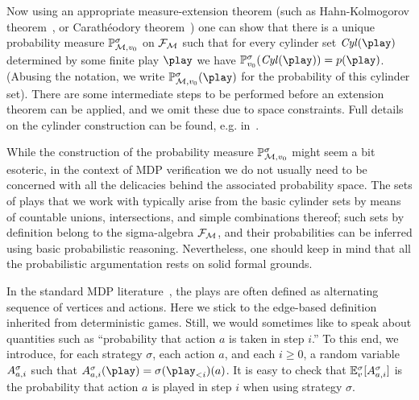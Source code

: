 Now using an appropriate measure-extension theorem
(such as Hahn-Kol\-mo\-go\-rov theorem~\cite[Corollary 2.5.4 and Proposition  2.5.7]{Rosenthal:2006}, or Carath\'eodory theorem~\cite[Theorem 1.3.10]{Ash&Doleans-Dade:2000}) one can show that there is a 
unique probability 
measure $\mathbb{P}^{\sigma}_{\mathcal{M},v_0} $ on $\mathcal{F}_{\mathcal{M}}$ such that for 
every cylinder set $\cylinder(\play)$ determined by some finite play $\play$ we have $\probm_{\vinit}^\sigma(\cylinder(\play))=\cylProb(\play)$. (Abusing the notation, we write $\probm^{\sigma}_{\mdp,\vinit}(\play)$ for the probability of this cylinder set). There 
are some intermediate steps to be performed before an extension theorem 
can be applied, and we omit these due to space constraints. Full details on the 
cylinder construction can be found, e.g. in~\cite{Ash&Doleans-Dade:2000,Novotny:2015}.

While the construction of the probability measure 
$\mathbb{P}^{\sigma}_{\mathcal{M},v_0}$ might seem a bit esoteric, in the context of 
MDP verification we do not usually need to be concerned with all the delicacies 
behind the associated probability space. The sets of plays that we work with 
typically arise from the basic cylinder sets by means of countable unions, 
intersections, and simple combinations thereof; such sets by definition belong 
to the 
sigma-algebra $\mathcal{F}_{\mathcal{M}}$, and their probabilities can be inferred using 
basic probabilistic reasoning. Nevertheless, one should keep in mind that all the 
probabilistic argumentation rests on solid formal grounds. 


In the standard MDP literature~\cite{Puterman:2005}, the plays are often defined as alternating sequence of vertices and actions. Here we stick to the edge-based definition inherited from deterministic games. Still, we would sometimes like to speak about quantities such as ``probability that action $a$ is taken in step $i$.'' To this end, we introduce, for each strategy $\sigma$, each action $a$,  and each $i\geq 0$,  a random variable $A^{\sigma}_{a,i}$ such that $\actevent{\sigma}{a}{i}(\play)=\sigma(\play_{< i})(a)$. It is easy to check that  $\mathbb{E}^\sigma_v[A^{\sigma}_{a,i}]$ is the probability that action $a$ is played in step $i$ when using strategy $\sigma$.


